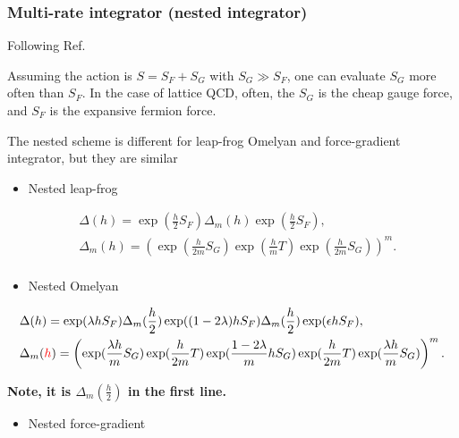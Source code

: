 \subsubsection{\label{sec:MultiRateUpdator}Multi-rate integrator (nested integrator)}

Following Ref.~\cite{forcegradient3}

Assuming the action is $S=S_F+S_G$ with $S_G\gg S_F$, one can evaluate $S_G$ more often than $S_F$. In the case of lattice QCD, often, the $S_G$ is the cheap gauge force, and $S_F$ is the expansive fermion force.

The nested scheme is different for leap-frog Omelyan and force-gradient integrator, but they are similar

\begin{itemize}
  \item Nested leap-frog
\end{itemize}

\begin{equation}
\begin{split}
&\Delta (h) =\exp (\frac{h}{2}S_F)\Delta _m (h) \exp (\frac{h}{2}S_F),\\
&\Delta _m(h)=\left(\exp(\frac{h}{2m}S_G)\exp(\frac{h}{m}T)\exp(\frac{h}{2m}S_G)\right)^m.\\
\end{split}
\end{equation}

\begin{itemize}
  \item Nested Omelyan
\end{itemize}

\begin{equation}
\begin{split}
&\Delta (h) =\exp (\lambda h S_F)\Delta _m (\frac{h}{2})\exp((1-2\lambda)hS_F)\Delta _m(\frac{h}{2}) \exp (\epsilon h S_F),\\
&\Delta _m(\textcolor[rgb]{1,0,0}{h})=\left(\exp(\frac{\lambda h}{m} S_G)\exp(\frac{h}{2m}T)\exp(\frac{1-2\lambda}{m}hS_G)\exp(\frac{h}{2m}T)\exp(\frac{\lambda h}{m}S_G)\right)^m.\\
\end{split}
\end{equation}

\textbf{Note, it is $\Delta _m (\frac{h}{2})$ in the first line.}

\begin{itemize}
  \item Nested force-gradient
\end{itemize}

